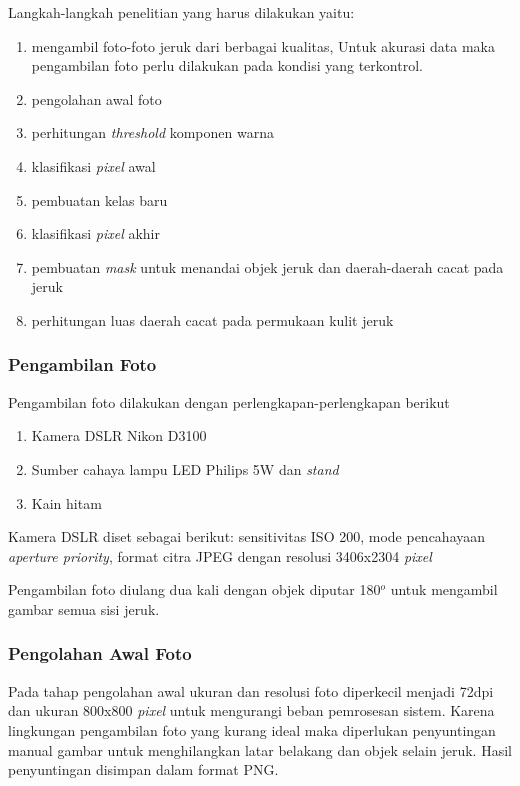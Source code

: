 \documentclass[laporan.tex]{subfiles}
\begin{document}
Langkah-langkah penelitian yang harus dilakukan yaitu:

\begin{enumerate}
\item mengambil foto-foto jeruk dari berbagai kualitas, Untuk akurasi data maka pengambilan foto perlu dilakukan pada kondisi yang terkontrol.
\item pengolahan awal foto
\item perhitungan \emph{threshold} komponen warna
\item klasifikasi \emph{pixel} awal
\item pembuatan kelas baru
\item klasifikasi \emph{pixel} akhir
\item pembuatan \emph{mask} untuk menandai objek jeruk dan daerah-daerah cacat pada jeruk
\item perhitungan luas daerah cacat pada permukaan kulit jeruk
\end{enumerate}

\subsubsection{Pengambilan Foto} \label{photoshoot}

Pengambilan foto dilakukan dengan perlengkapan-perlengkapan berikut

\begin{enumerate}
\item Kamera DSLR Nikon D3100
\item Sumber cahaya lampu LED Philips 5W dan \emph{stand}
\item Kain hitam
\end{enumerate}

Kamera DSLR diset sebagai berikut: sensitivitas ISO 200, mode pencahayaan \emph{aperture priority}, format citra JPEG dengan resolusi 3406x2304 \emph{pixel}


Pengambilan foto diulang dua kali dengan objek diputar 180$^o$ untuk mengambil gambar semua sisi jeruk.

\subsubsection{Pengolahan Awal Foto}

Pada tahap pengolahan awal ukuran dan resolusi foto diperkecil menjadi 72dpi dan ukuran 800x800 \emph{pixel} untuk mengurangi beban pemrosesan sistem. Karena lingkungan pengambilan foto yang kurang ideal maka diperlukan penyuntingan manual gambar untuk menghilangkan latar belakang dan objek selain jeruk. Hasil penyuntingan disimpan dalam format PNG.
\end{document}
